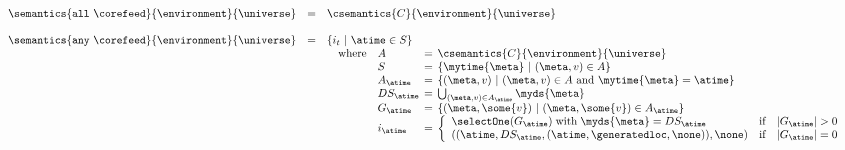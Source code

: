 \begin{figure*}[t]
\[\begin{array}{lcl}
\\



\\\\

\semantics{\mathtt{all}\ \corefeed}{\environment}{\universe} 
&=& 
\csemantics{C}{\environment}{\universe}
\\\\


\semantics{\mathtt{any}\ \corefeed}{\environment}{\universe}
& = & \{ i_t\ |\ \atime \in S\}\\
&&
\begin{array}{l}
 \begin{array}{ll@{\hspace{1ex}}c@{\hspace{1ex}}l}
 \mbox{where} & A        & = &\csemantics{C}{\environment}{\universe}\\
              & S        & = & \{\mytime{\meta}\ |\ (\meta, v) \in A\}\\
              & A_\atime & = & \{(\meta,v)\ | \ (\meta, v) \in A\ \mbox{and} \ \mytime{\meta} = \atime\}\\
              & DS_\atime & = & \bigcup_{(\meta,v) \in A_\atime} \myds{\meta} \\
              & G_\atime & = & \{(\meta,\some{v})\ | \ (\meta, \some{v}) \in A_\atime\}\\
              & i_\atime & = & \left\{ \begin{array}{lll}
                                           \mbox{\selectOne}(G_\atime) \; \mbox{with} \; \myds{\meta} = DS_\atime& \mbox{if} & |G_\atime| > 0\\
                                           ((\atime, DS_\atime, (\atime,\generatedloc,\none)), \none) & \mbox{if} & |G_\atime| = 0 \\
                                           \end{array} \right.
 \end{array}
\end{array} 
\\\\


\end{array}\]
\end{figure*}
